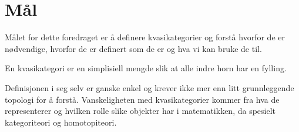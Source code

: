 
\section{Mål}

Målet for dette foredraget er å definere kvasikategorier og forstå hvorfor de er nødvendige, hvorfor de er definert som de er og hva vi kan bruke de til. 

\begin{goal}
    En kvasikategori er en simplisiell mengde slik at alle indre horn har en fylling.
\end{goal}

Definisjonen i seg selv er ganske enkel og krever ikke mer enn litt grunnleggende topologi for å forstå. 
Vanskeligheten med kvasikategorier kommer fra hva de representerer og hvilken rolle slike objekter har i matematikken, da spesielt kategoriteori og homotopiteori. 

